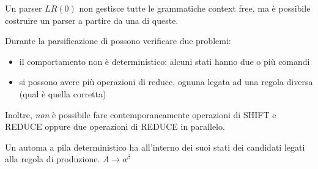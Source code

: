 \documentclass[11pt]{article}
\begin{document}
Un parser $LR(0)$ non gestisce tutte le grammatiche context free, ma è possibile costruire un parser a partire da una di
queste.

Durante la parsificazione di possono verificare due problemi:
\begin{itemize}
    \item il comportamento non è deterministico: alcuni stati hanno due o più comandi
    \item si possono avere più operazioni di reduce, ognuna legata ad una regola diversa (qual è quella corretta)
\end{itemize}
Inoltre, \textit{non} è possibile fare contemporaneamente operazioni di SHIFT e REDUCE oppure due operazioni di REDUCE in 
parallelo.

Un automa a pila deterministico ha all'interno dei suoi stati dei candidati legati alla regola di produzione.
$A\rightarrow a^\beta$
\end{document}
